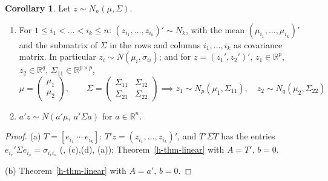 \documentclass[12pt]{article}
\newcommand{\R}{\mathbb R}
\theoremstyle{definition}
\newtheorem{corollary}[theorem]{Corollary}
\begin{document}
\begin{corollary}\label{h-cor-marginal}
Let \(z\sim N_n(\mu,\Sigma)\).
\begin{enumerate}
\item For \(1\leqslant i_1<\dots<i_k\leqslant n\): \((z_{i_1},\dots,z_{i_k})'\sim N_k\), with the mean
\((\mu_{i_1},\dots,\mu_{i_k})'\) and the submatrix of \(\Sigma\) in the rows and columns \(i_1,\dots,i_k\) as covariance
matrix. In particular \(z_i\sim N(\mu_i,\sigma_{ii})\); and for \(z=(z_1',z_2')'\), \(z_1\in\R^p\), \(z_2\in\R^q\),
\(\Sigma_{11}\in\R^{p\times p}\),
\[
\mu=\begin{pmatrix}\mu_1\\\mu_2\end{pmatrix},\qquad\Sigma=\begin{pmatrix}\Sigma_{11}&\Sigma_{12}\\\Sigma_{21}&\Sigma_{22}\end{pmatrix}
\implies z_1\sim N_p(\mu_1,\Sigma_{11}),\quad z_2\sim N_q(\mu_2,\Sigma_{22})
\]
\item \(a'z\sim N(a'\mu,\ a'\Sigma a)\) for \(a\in\R^n\).
\end{enumerate}
\end{corollary}
\begin{proof}
(a) \(T=[e_{i_1}\ \cdots\ e_{i_k}]\): \(T'z=(z_{i_1},\dots,z_{i_k})'\), and \(T'\Sigma T\) has the entries
\(e_{i_r}'\Sigma e_{i_s}=\sigma_{i_ri_s}\) (, (c),(d), (a)); Theorem~\ref{h-thm-linear}
with \(A=T'\), \(b=0\).

(b) Theorem~\ref{h-thm-linear} with \(A=a'\), \(b=0\).
\end{proof}
\end{document}
